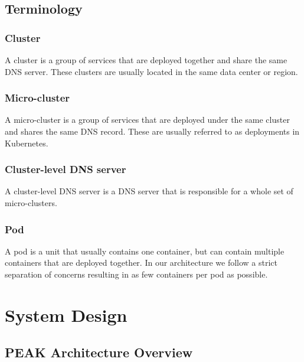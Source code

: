 \documentclass[12pt]{article}
\begin{document}
\subsection{Terminology}
\subsubsection{Cluster}
    A cluster is a group of services that are deployed together and share the same DNS server.
    These clusters are usually located in the same data center or region.
\subsubsection{Micro-cluster}
    A micro-cluster is a group of services that are deployed under the same cluster and shares the same DNS record.
    These are usually referred to as deployments in Kubernetes.
\subsubsection{Cluster-level DNS server}
    A cluster-level DNS server is a DNS server that is responsible for a whole set of micro-clusters.
\subsubsection{Pod}
    A pod is a unit that usually contains one container, but can contain multiple containers that are deployed together.
    In our architecture we follow a strict separation of concerns resulting in as few containers per pod as possible.

\section{System Design}
\subsection{PEAK Architecture Overview}
\end{document}
